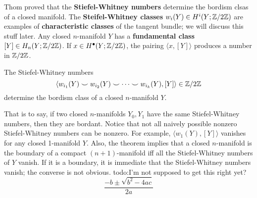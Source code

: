 Thom proved that the \textbf{Stiefel-Whitney numbers} determine the bordism clsas of a closed manifold. The \textbf{Steifel-Whitney classes} $w_i (Y) \in H^i  (Y; \mathbb{Z} /2\mathbb{Z})$ are examples of \textbf{characteristic classes} of the tangent bundle; we will discuss this stuff later. Any closed $n$-manifold $Y$ has a \textbf{fundamental class} $[Y] \in H_n (Y;\mathbb{Z} /2\mathbb{Z})$. If $x \in H^{\bullet}(Y; \mathbb{Z} /2\mathbb{Z})$, the pairing $\langle x,[Y] \rangle $ produces a number in $\mathbb{Z} /2\mathbb{Z}$.
\begin{theorem}
    The Stiefel-Whitney numbers \[
        \langle w_{i_1} (Y)\smile w_{i_2}(Y)\smile \cdots \smile w_{i_k}(Y),[Y]\rangle \in \mathbb{Z} /2 \mathbb{Z}
    \] determine the bordism class of a closed $n$-manifold $Y$.
\end{theorem}
That is to say, if two closed $n$-manifolds $Y_0,Y_1$ have the same Stiefel-Whitney numbers, then they are bordant. Notice that not all naively possible nonzero Stiefel-Whitney numbers can be nonzero. For example, $\langle w_1(Y),[Y] \rangle $ vanishes for any closed 1-manifold $Y$. Also, the theorem implies that a closed $n$-manifold is the boundary of a compact $(n+1)$-manifold iff all the Stiefel-Whitney numbers of $Y$ vanish. If it is a boundary, it is immediate that the Stiefel-Whitney numbers vanish; the converse is not obvious. {\color{red}todo:I'm not supposed to get this right yet?} \[
\frac{-b\pm \sqrt{b^2-4ac} }{2a}
\] 
